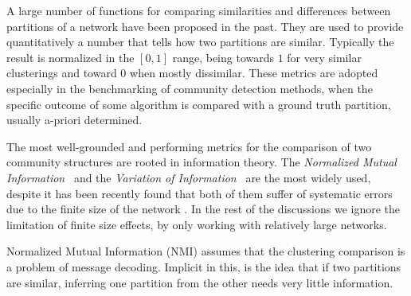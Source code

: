 A large number of functions for comparing similarities and differences between partitions of a network have been proposed in the past. They are used to provide quantitatively a number that tells how two partitions are similar.
Typically the result is normalized in the $[0,1]$ range, being towards $1$ for very similar clusterings and toward $0$ when mostly dissimilar. These metrics are adopted especially in the benchmarking of community detection methods, when the specific outcome of some algorithm is compared with a ground truth partition, usually a-priori determined.

The most well-grounded and performing metrics for the comparison of two community structures are rooted in information theory\cite{cover2006}.
The \emph{Normalized Mutual Information}~\cite{danon2005} and the \emph{Variation of Information}~\cite{meila2007} are the most widely used, despite it has been recently found that both of them suffer of systematic errors due to the finite size of the network \cite{zhang2015a}. In the rest of the discussions we ignore the limitation of finite size effects, by only working with relatively large networks.

Normalized Mutual Information (NMI) assumes that the clustering comparison is a problem of message decoding. Implicit in this, is the idea that if two partitions are similar, inferring one partition from the other needs very little information. 

